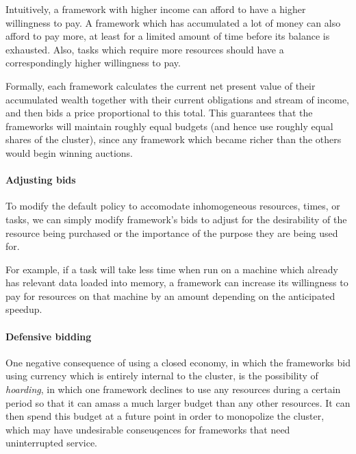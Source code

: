 \documentclass{acm_proc_article-sp}
\begin{document}
Intuitively, a framework with higher income can afford to have a higher
willingness to pay. A framework which has accumulated a lot of money can also
afford to pay more, at least for a limited amount of time before its balance is
exhausted. Also, tasks which require more resources should have a
correspondingly higher willingness to pay.

Formally, each framework calculates the current net present value
of their accumulated wealth together with their current obligations
and stream of income, and then bids a price proportional
to this total. This guarantees that the frameworks will
maintain roughly equal budgets (and hence use roughly equal shares
of the cluster), since any framework which became richer
than the others would begin winning auctions.
\vspace{-5mm}
\paragraph{Adjusting bids} To modify the 
default policy to accomodate inhomogeneous resources,
times, or tasks, we can simply modify framework's
bids to adjust for the desirability of the resource being
purchased or the importance of the purpose they are being used for.

For example, if a task will take less time when run on a machine
which already has relevant data loaded into memory,
a framework can increase its willingness to pay for resources on that machine
by an amount depending on the anticipated speedup.
\vspace{-5mm}
\paragraph{Defensive bidding} One negative consequence of using a closed economy,
in which the frameworks bid using currency which is entirely internal to the cluster,
is the possibility of \emph{hoarding}, in which one framework
declines to use any resources during a certain period so that it can amass
a much larger budget than any other resources.
It can then spend this budget at a future point in order to monopolize the cluster,
which may have undesirable conseuqences for frameworks that need uninterrupted service.
\end{document}
